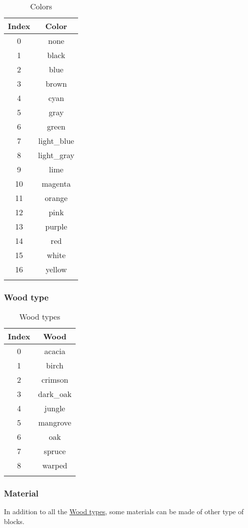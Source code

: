 \begin{longtable}{ |c|c| }
	\hline
	Index & Color \\
	\hline
	\endhead
	0 & none \\
	1 & black \\
	2 & blue \\
	3 & brown \\
	4 & cyan \\
	5 & gray \\
	6 & green \\
	7 & light\_blue \\
	8 & light\_gray \\
	9 & lime \\
	10 & magenta \\
	11 & orange \\
	12 & pink \\
	13 & purple \\
	14 & red \\
	15 & white \\
	16 & yellow \\
	\hline
	\caption{Colors}
\end{longtable}

\subsubsection{Wood type}\label{ab:wood}

\begin{longtable}{ |c|c| }
	\hline
	Index & Wood \\
	\hline
	\endhead
	0 & acacia \\
	1 & birch \\
	2 & crimson \\
	3 & dark\_oak \\
	4 & jungle \\
	5 & mangrove \\
	6 & oak \\
	7 & spruce \\
	8 & warped \\
	\hline
	\caption{Wood types}
\end{longtable}


\subsubsection{Material}
In addition to all the \hyperref[ab:wood]{Wood types}, some materials can be made of other type of blocks.


